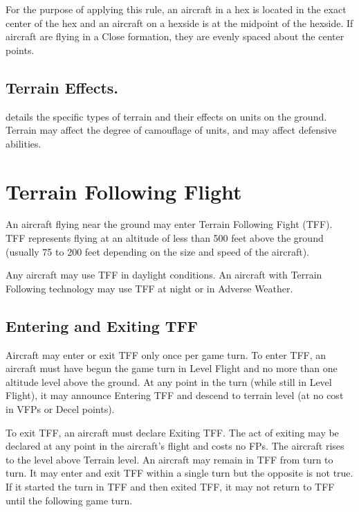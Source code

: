 For the purpose of applying this rule, an aircraft in a hex is located in the exact center of the hex and an aircraft on a hexside is at the midpoint of the hexside. If aircraft are flying in a Close formation, they are evenly spaced about the center points.


\subsection{Terrain Effects\protect{}.}  details the specific types of terrain and their effects on units on the ground. Terrain may affect the degree of camouflage of units, and may affect defensive abilities.

\section{Terrain Following Flight}
\label{rule:terrain-following-flight}

An aircraft flying near the ground may enter Terrain Following Fight (TFF). TFF represents flying at an altitude of less than 500 feet above the ground (usually 75 to 200 feet depending on the size and speed of the aircraft).

Any aircraft may use TFF in daylight conditions. An aircraft with Terrain Following technology may use TFF at night or in Adverse Weather.

\subsection{Entering and Exiting TFF} Aircraft may enter or exit TFF only once per game turn. To enter TFF, an aircraft must have begun the game turn in Level Flight and no more than one altitude level above the ground. At any point in the turn (while still in Level Flight), it may announce Entering TFF and descend to terrain level (at no cost in VFPs or Decel points).

To exit TFF, an aircraft must declare Exiting TFF. The act of exiting may be declared at any point in the aircraft's flight and costs no FPs. The aircraft rises to the level above Terrain level. An aircraft may remain in TFF from turn to turn. It may enter and exit TFF within a single turn but the opposite is not true.  If it started the turn in TFF and then exited TFF, it may not return to TFF until the following game turn. 

